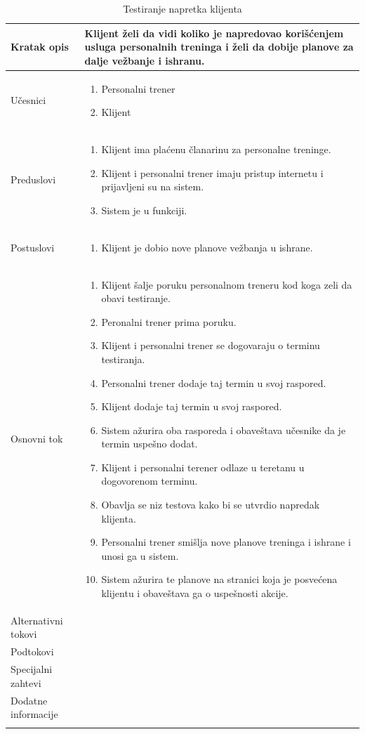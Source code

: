 \begin{longtable}{| p{} | p{} |} 
\hline
    Kratak opis & Klijent želi da vidi koliko je napredovao korišćenjem usluga personalnih treninga i želi da dobije planove za dalje vežbanje i ishranu. \\ 
\hline    
    Učesnici & \begin{enumerate}
    \item Personalni trener
    \item Klijent
   \end{enumerate}\\
\hline
   Preduslovi & 
   \begin{enumerate}
    \item Klijent ima plaćenu članarinu za personalne treninge.
    \item Klijent i personalni trener imaju pristup internetu i prijavljeni su na sistem.
    \item Sistem je u funkciji.
   \end{enumerate}\\
\hline  
    Postuslovi &
    \begin{enumerate}
    \item Klijent je dobio nove planove vežbanja u ishrane.
    \end{enumerate}\\
\hline
    Osnovni tok & 
    \begin{enumerate}
    \item Klijent šalje poruku personalnom treneru kod koga zeli da obavi testiranje.
    \item Peronalni trener prima poruku.
    \item Klijent i personalni trener se dogovaraju o terminu testiranja.
    \item Personalni trener dodaje taj termin u svoj raspored.
    \item Klijent dodaje taj termin u svoj raspored.
    \item Sistem ažurira oba rasporeda i obaveštava učesnike da je termin uspešno dodat.
    \item Klijent i personalni terener odlaze u teretanu u dogovorenom terminu.
    \item Obavlja se niz testova kako bi se utvrdio napredak klijenta.
    \item Personalni trener smišlja nove planove treninga i ishrane i unosi ga u sistem.
    \item Sistem ažurira te planove na stranici koja je posvećena klijentu i obaveštava ga o uspešnosti akcije.
    \end{enumerate}\\
\hline
    Alternativni tokovi & \\
\hline
    Podtokovi & \\
\hline
    Specijalni zahtevi & \\
\hline
    Dodatne informacije & \\
\hline
\caption{Testiranje napretka klijenta} 
\end{longtable}